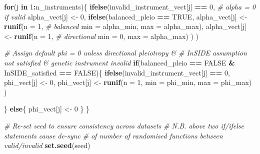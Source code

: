 \documentclass[
]{article}
\newenvironment{Shaded}{\begin{snugshade}}{\end{snugshade}}
\newcommand{\AttributeTok}[1]{\textcolor[rgb]{0.13,0.29,0.53}{#1}}
\newcommand{\CommentTok}[1]{\textcolor[rgb]{0.56,0.35,0.01}{\textit{#1}}}
\newcommand{\ConstantTok}[1]{\textcolor[rgb]{0.56,0.35,0.01}{#1}}
\newcommand{\ControlFlowTok}[1]{\textcolor[rgb]{0.13,0.29,0.53}{\textbf{#1}}}
\newcommand{\DecValTok}[1]{\textcolor[rgb]{0.00,0.00,0.81}{#1}}
\newcommand{\FunctionTok}[1]{\textcolor[rgb]{0.13,0.29,0.53}{\textbf{#1}}}
\newcommand{\NormalTok}[1]{#1}
\newcommand{\OtherTok}[1]{\textcolor[rgb]{0.56,0.35,0.01}{#1}}
\newcommand{\SpecialCharTok}[1]{\textcolor[rgb]{0.81,0.36,0.00}{\textbf{#1}}}
\begin{document}
\begin{Shaded}
\begin{Highlighting}[]
  
  \ControlFlowTok{for}\NormalTok{(j }\ControlFlowTok{in} \DecValTok{1}\SpecialCharTok{:}\NormalTok{n\_instruments)\{}
    \FunctionTok{ifelse}\NormalTok{(invalid\_instrument\_vect[j] }\SpecialCharTok{==} \DecValTok{0}\NormalTok{, }\CommentTok{\# alpha = 0 if valid}
\NormalTok{           alpha\_vect[j] }\OtherTok{\textless{}{-}} \DecValTok{0}\NormalTok{,}
           \FunctionTok{ifelse}\NormalTok{(balanced\_pleio }\SpecialCharTok{==} \ConstantTok{TRUE}\NormalTok{,}
\NormalTok{                  alpha\_vect[j] }\OtherTok{\textless{}{-}} \FunctionTok{runif}\NormalTok{(}\AttributeTok{n =} \DecValTok{1}\NormalTok{, }\CommentTok{\# balanced}
                                         \AttributeTok{min =}\NormalTok{ alpha\_min,}
                                         \AttributeTok{max =}\NormalTok{ alpha\_max),}
\NormalTok{                  alpha\_vect[j] }\OtherTok{\textless{}{-}} \FunctionTok{runif}\NormalTok{(}\AttributeTok{n =} \DecValTok{1}\NormalTok{, }\CommentTok{\# directional}
                                         \AttributeTok{min =} \DecValTok{0}\NormalTok{,}
                                         \AttributeTok{max =}\NormalTok{ alpha\_max)}
\NormalTok{           )}
\NormalTok{    )}
    
    
    \CommentTok{\# Assign default phi = 0 unless directional pleiotropy \& }
    \CommentTok{\# InSIDE assumption not satisfied \& genetic instrument invalid}
    \ControlFlowTok{if}\NormalTok{(balanced\_pleio }\SpecialCharTok{==} \ConstantTok{FALSE} \SpecialCharTok{\&}\NormalTok{ InSIDE\_satisfied }\SpecialCharTok{==} \ConstantTok{FALSE}\NormalTok{)\{}
      \FunctionTok{ifelse}\NormalTok{(invalid\_instrument\_vect[j] }\SpecialCharTok{==} \DecValTok{0}\NormalTok{,}
\NormalTok{             phi\_vect[j] }\OtherTok{\textless{}{-}} \DecValTok{0}\NormalTok{,}
\NormalTok{             phi\_vect[j] }\OtherTok{\textless{}{-}} \FunctionTok{runif}\NormalTok{(}\AttributeTok{n =} \DecValTok{1}\NormalTok{,}
                                  \AttributeTok{min =}\NormalTok{ phi\_min,}
                                  \AttributeTok{max =}\NormalTok{ phi\_max)}
\NormalTok{      )}
      
\NormalTok{    \}}
    \ControlFlowTok{else}\NormalTok{\{}
\NormalTok{      phi\_vect[j] }\OtherTok{\textless{}{-}} \DecValTok{0}
\NormalTok{    \}}
\NormalTok{  \}}
  
  \CommentTok{\# Re{-}set seed to ensure consistency across datasets}
  \CommentTok{\# N.B. above two if/ifelse statements cause de{-}sync }
  \CommentTok{\# of number of randomised functions between valid/invalid}
  \FunctionTok{set.seed}\NormalTok{(seed)}
  

\end{Highlighting}
\end{Shaded}
\end{document}
